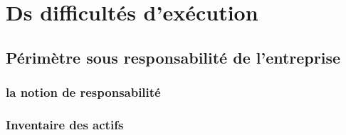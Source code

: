 %
%




\section{Ds difficultés d'exécution }
\subsection{Périmètre sous responsabilité de l’entreprise}

\subsubsection{la notion de responsabilité}


\subsubsection{Inventaire des actifs}
%
